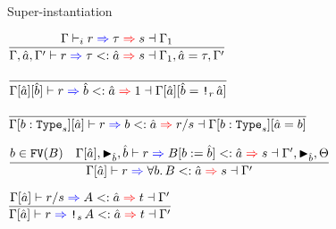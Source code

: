 \documentclass{beamer}
\begin{document}
\begin{frame}{Super-instantiation}

\begin{center}
  $\infrule{\newkinding{\Gamma}{r}{\tau}{s}{\Gamma_1}}{\superinst{\Gamma, \evar{a}, \Gamma'}{r}{\tau}{\evar{a}}{s}{\Gamma_1, \evar{a}[\tau], \Gamma'}}$

  \vspace{2em}

  $\infrule{}{\superinst{\holectx{\holectx{\Gamma}{\evar{a}}}{\evar{b}}}{r}{\evar{b}}{\evar{a}}{\One}{\holectx{\holectx{\Gamma}{\evar{a}}}{\evar{b}[\Box[r]{\evar{a}}]}}}$

  \vspace{2em}

  $\infrule{}{\superinst{\holectx{\holectx{\Gamma}{\var{b}{\Type[s]}}}{\evar{a}}}{r}{b}{\evar{a}}{\divqty{r}{s}}{\holectx{\holectx{\Gamma}{\var{b}{\Type[s]}}}{\evar{a}[b]}}}$

  \vspace{2em}

  $\infrule{b \in \FV{B} \quad \superinst{\holectx{\Gamma}{\evar{a}}, \marker{\evar{b}}, \evar{b}}{r}{\subst{B}{b}{\evar{b}}}{\evar{a}}{s}{\Gamma', \marker{\evar{b}}, \Theta}}{\superinst{\holectx{\Gamma}{\evar{a}}}{r}{\ForallI{b}{B}}{\evar{a}}{s}{\Gamma'}}$

  \vspace{2em}

  $\infrule{\superinst{\holectx{\Gamma}{\evar{a}}}{\divqty{r}{s}}{A}{\evar{a}}{t}{\Gamma'}}{\superinst{\holectx{\Gamma}{\evar{a}}}{r}{\Box[s]{A}}{\evar{a}}{t}{\Gamma'}}$
\end{center}

\end{frame}
\end{document}
